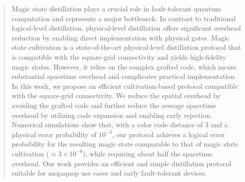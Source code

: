 \begin{abstract}
Magic state distillation plays a crucial role in fault-tolerant quantum computation and represents a major bottleneck.
In contrast to traditional logical-level distillation, physical-level distillation offers significant overhead reduction by enabling direct implementation with physical gates.
Magic state cultivation is a state-of-the-art physical-level distillation protocol that is compatible with the square-grid connectivity and yields high-fidelity magic states.
However, it relies on the complex grafted code, which incurs substantial spacetime overhead and complicates practical implementation.
In this work, we propose an efficient cultivation-based protocol compatible with the square-grid connectivity.
We reduce the spatial overhead by avoiding the grafted code and further reduce the average spacetime overhead by utilizing code expansion and enabling early rejection.
Numerical simulations show that, with a color code distance of 3 and a physical error probability of $10^{-3}$, our protocol achieves a logical error probability for the resulting magic state comparable to that of magic state cultivation ($\approx 3 \times 10^{-6}$), while requiring about half the spacetime overhead.
Our work provides an efficient and simple distillation protocol suitable for megaquop use cases and early fault-tolerant devices.
\end{abstract}